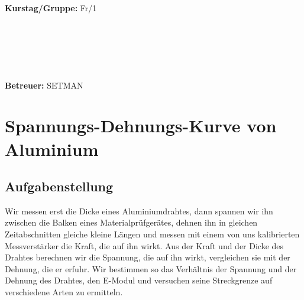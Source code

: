 \documentclass{article}
\begin{document}
\begin{verbatim}


\end{verbatim}
			\begin{flushleft}
			\textbf{\Large{Kurstag/Gruppe:}} \Large{Fr/1}
			\end{flushleft}

\begin{verbatim}






\end{verbatim}
			\begin{flushleft}
			\LARGE{\textbf{Betreuer:}}	\Large{SETMAN}	
			\end{flushleft}
			
\newpage
\section{Spannungs-Dehnungs-Kurve von Aluminium}
\subsection{Aufgabenstellung}
Wir messen erst die Dicke eines Aluminiumdrahtes, dann spannen wir ihn zwischen die Balken eines Materialprüfgerätes, dehnen ihn in gleichen Zeitabschnitten gleiche kleine Längen und messen mit einem von uns kalibrierten Messverstärker die Kraft, die auf ihn wirkt. Aus der Kraft und der Dicke des Drahtes berechnen wir die Spannung, die auf ihn wirkt, vergleichen sie mit der Dehnung, die er erfuhr. Wir bestimmen so das Verhältnis der Spannung und der Dehnung des Drahtes, den E-Modul und versuchen seine Streckgrenze auf verschiedene Arten zu ermitteln.
\end{document}
